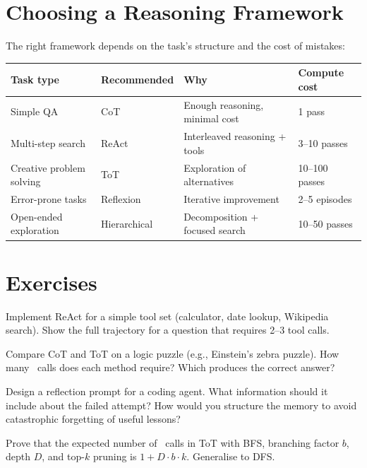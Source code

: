 \section{Choosing a Reasoning Framework}

The right framework depends on the task's structure and the cost of mistakes:

\begin{longtable}{p{3cm}p{4cm}p{4cm}p{4cm}}
	\toprule
	\textbf{Task type}       & \textbf{Recommended} & \textbf{Why}                   & \textbf{Compute cost} \\
	\midrule
	Simple QA                & CoT                  & Enough reasoning, minimal cost & 1 pass                \\
	Multi-step search        & ReAct                & Interleaved reasoning + tools  & 3--10 passes          \\
	Creative problem solving & ToT                  & Exploration of alternatives    & 10--100 passes        \\
	Error-prone tasks        & Reflexion            & Iterative improvement          & 2--5 episodes         \\
	Open-ended exploration   & Hierarchical         & Decomposition + focused search & 10--50 passes         \\
	\bottomrule
\end{longtable}

\section{Exercises}

\begin{exercise}
	Implement ReAct for a simple tool set (calculator, date lookup, Wikipedia search). Show the full trajectory for a question that requires 2--3 tool calls.
\end{exercise}

\begin{exercise}
	Compare CoT and ToT on a logic puzzle (e.g., Einstein's zebra puzzle). How many \llm\ calls does each method require? Which produces the correct answer?
\end{exercise}

\begin{exercise}
	Design a reflection prompt for a coding agent. What information should it include about the failed attempt? How would you structure the memory to avoid catastrophic forgetting of useful lessons?
\end{exercise}

\begin{exercise}
	Prove that the expected number of \llm\ calls in ToT with BFS, branching factor $b$, depth $D$, and top-$k$ pruning is $1 + D \cdot b \cdot k$. Generalise to DFS.
\end{exercise}
